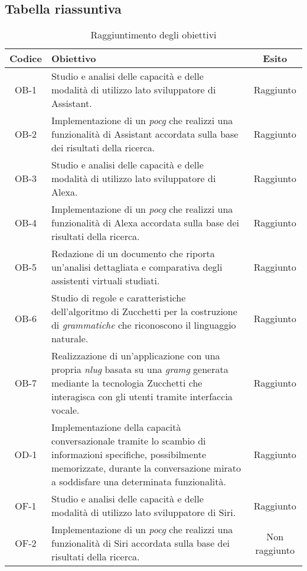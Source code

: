 \subsection{Tabella riassuntiva}
\begin{table}
	\begin{tabularx}{\textwidth}{|c|X|c|}
		\hline
		\textbf{Codice} & \textbf{Obiettivo} & \textbf{Esito} \\
		\hline
		OB-1 & Studio e analisi delle capacità e delle modalità di utilizzo lato sviluppatore di Assistant. & Raggiunto \\
		\hline
		OB-2 & Implementazione di un \emph{\gls{pocg}} che realizzi una funzionalità di Assistant accordata sulla base dei risultati della ricerca. & Raggiunto \\
		\hline
		OB-3 & Studio e analisi delle capacità e delle modalità di utilizzo lato sviluppatore di Alexa. & Raggiunto \\
		\hline
		OB-4 & Implementazione di un \emph{\gls{pocg}} che realizzi una funzionalità di Alexa accordata sulla base dei risultati della ricerca. & Raggiunto \\
		\hline
		OB-5 & Redazione di un documento che riporta un'analisi dettagliata e comparativa degli assistenti virtuali studiati. & Raggiunto \\
		\hline
		OB-6 & Studio di regole e caratteristiche dell'algoritmo di Zucchetti per la costruzione di \emph{grammatiche} che riconoscono il linguaggio naturale. & Raggiunto \\
		\hline
		OB-7 & Realizzazione di un'applicazione con una propria \emph{\gls{nlug}} basata su una \emph{\gls{gramg}} generata mediante la tecnologia Zucchetti che interagisca con gli utenti tramite interfaccia vocale. & Raggiunto \\
		\hline
		OD-1 & Implementazione della capacità conversazionale tramite lo scambio di informazioni specifiche, possibilmente memorizzate, durante la conversazione mirato a soddisfare una determinata funzionalità. & Raggiunto \\	
		\hline
		OF-1 & Studio e analisi delle capacità e delle modalità di utilizzo lato sviluppatore di Siri. & Raggiunto \\	
		\hline
		OF-2 & Implementazione di un \emph{\gls{pocg}} che realizzi una funzionalità di Siri accordata sulla base dei risultati della ricerca. & Non raggiunto\\	
		\hline
	\end{tabularx}
	\caption{Raggiuntimento degli obiettivi}
\end{table}
\pagebreak
